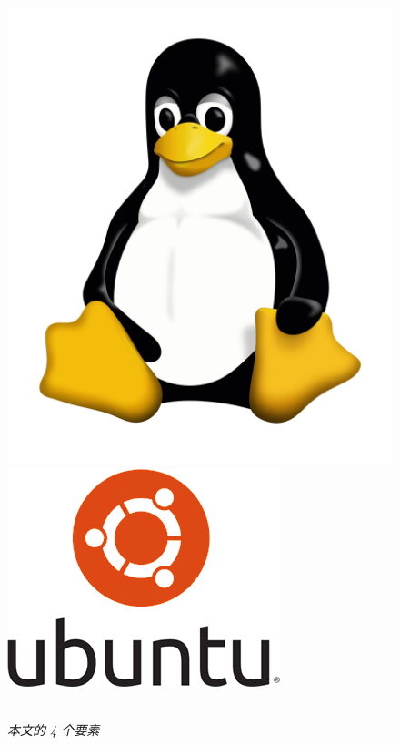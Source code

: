 \documentclass[UTF-8]{ctexart}
\begin{document}
\begin{figure}[H]
\begin{minipage}{0.15\textwidth}
			\caption*{}
		\end{minipage}
		\begin{minipage}{0.15\textwidth}
			\centering
			\includegraphics[width=\textwidth]{fig/tux.png}
			\caption*{}
		\end{minipage}
		\begin{minipage}{0.15\textwidth}
			\centering
			\includegraphics[width=\textwidth]{fig/ubuntu.png}
			\caption*{}
		\end{minipage}
		\\
		\textit{本文的 4 个要素}
	\end{figure}
\end{document}
